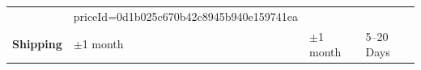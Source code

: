 \begin{table}[htp]
\begin{tabularx}{\textwidth}{lXXX}
        {\href{https://www.alibaba.com/product-detail/Long-Life-Cycle-PEM-Hydrogen-Fuel_1601624915790.html?spm=a2700.galleryofferlist.normal_offer.d_title.792d13a09NNM3m      & priceId=0d1b025c670b42c8945b940e159741ea}{alibaba}}                                      \\
        \textbf{Shipping}                                                                                                                                                      & $\pm$1 month                                        & $\pm$1 month   & 5--20 Days        \\
        \bottomrule
    \end{tabularx}
\end{table}

\clearpage

